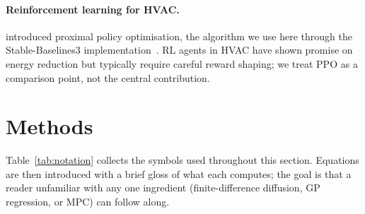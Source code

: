 \documentclass[11pt,letterpaper]{article}
\begin{document}
\paragraph{Reinforcement learning for HVAC.}
\citet{schulman2017} introduced proximal policy optimisation, the
algorithm we use here through the Stable-Baselines3
implementation~\citep{raffin2021}. RL agents in HVAC have shown
promise on energy reduction but typically require careful reward
shaping; we treat PPO as a comparison point, not the central
contribution.

\section{Methods}

Table~\ref{tab:notation} collects the symbols used throughout this section.
Equations are then introduced with a brief gloss of what each computes;
the goal is that a reader unfamiliar with any one ingredient (finite-difference
diffusion, GP regression, or MPC) can follow along.
\end{document}
